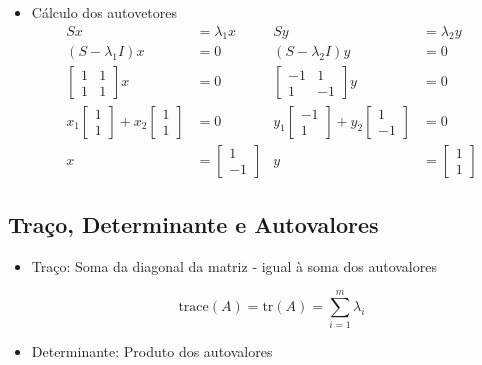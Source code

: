 \documentclass[
  letterpaper,
  DIV=11,
  numbers=noendperiod]{scrartcl}
\providecommand{\tightlist}{%
  \setlength{\itemsep}{0pt}\setlength{\parskip}{0pt}}\usepackage{longtable,booktabs,array}
\begin{document}
\begin{tcolorbox}
\begin{itemize}
\tightlist
\item
  Cálculo dos autovetores \begin{align}
  Sx &= \lambda_1x & Sy &= \lambda_2 y\\
  (S-\lambda_1 I)x &=0 & (S-\lambda_2 I)y &=0\\
  \begin{bmatrix}1 & 1 \\ 1 & 1\end{bmatrix}x &=0 & \begin{bmatrix}-1 & 1 \\ 1 & -1\end{bmatrix}y &=0 \\
  x_1\begin{bmatrix}1 \\ 1\end{bmatrix} + x_2\begin{bmatrix}1 \\ 1\end{bmatrix} &= 0 & y_1\begin{bmatrix}-1 \\ 1\end{bmatrix} + y_2\begin{bmatrix}1 \\ -1\end{bmatrix} &= 0\\
  x &= \begin{bmatrix} 1\\-1\end{bmatrix} & y &= \begin{bmatrix} 1\\1\end{bmatrix}
  \end{align}
\end{itemize}

\end{tcolorbox}

\hypertarget{trauxe7o-determinante-e-autovalores}{%
\subsection{Traço, Determinante e
Autovalores}\label{trauxe7o-determinante-e-autovalores}}

\begin{itemize}
\item
  Traço: Soma da diagonal da matriz - igual à soma dos autovalores

  \[ \text{trace}(A) = \text{tr}(A) = \sum_{i=1}^m \lambda_i\]
\item
  Determinante: Produto dos autovalores
\end{itemize}
\end{document}
